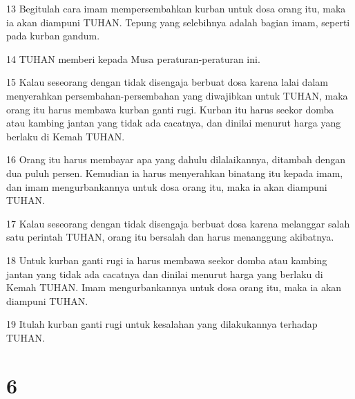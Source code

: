 \par 13 Begitulah cara imam mempersembahkan kurban untuk dosa orang itu, maka ia akan diampuni TUHAN. Tepung yang selebihnya adalah bagian imam, seperti pada kurban gandum.
\par 14 TUHAN memberi kepada Musa peraturan-peraturan ini.
\par 15 Kalau seseorang dengan tidak disengaja berbuat dosa karena lalai dalam menyerahkan persembahan-persembahan yang diwajibkan untuk TUHAN, maka orang itu harus membawa kurban ganti rugi. Kurban itu harus seekor domba atau kambing jantan yang tidak ada cacatnya, dan dinilai menurut harga yang berlaku di Kemah TUHAN.
\par 16 Orang itu harus membayar apa yang dahulu dilalaikannya, ditambah dengan dua puluh persen. Kemudian ia harus menyerahkan binatang itu kepada imam, dan imam mengurbankannya untuk dosa orang itu, maka ia akan diampuni TUHAN.
\par 17 Kalau seseorang dengan tidak disengaja berbuat dosa karena melanggar salah satu perintah TUHAN, orang itu bersalah dan harus menanggung akibatnya.
\par 18 Untuk kurban ganti rugi ia harus membawa seekor domba atau kambing jantan yang tidak ada cacatnya dan dinilai menurut harga yang berlaku di Kemah TUHAN. Imam mengurbankannya untuk dosa orang itu, maka ia akan diampuni TUHAN.
\par 19 Itulah kurban ganti rugi untuk kesalahan yang dilakukannya terhadap TUHAN.

\chapter{6}

